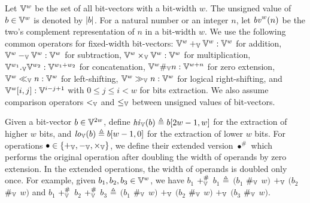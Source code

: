 Let $\mathbb{V}^w$ be the set of all bit-vectors with a bit-width $w$.
The unsigned value of $b \in \mathbb{V}^w$ is denoted by $|b|$.
For a natural number or an integer $n$, let $\mathit{bv}^w(n)$ be the two's complement representation of $n$ in a bit-width $w$.
We use the following common operators for fixed-width bit-vectors: $\mathbb{V}^w +_{\mathbb{V}} \mathbb{V}^w : \mathbb{V}^w$ for addition, $\mathbb{V}^w -_{\mathbb{V}} \mathbb{V}^w : \mathbb{V}^w$ for subtraction, $\mathbb{V}^w \times_{\mathbb{V}} \mathbb{V}^w : \mathbb{V}^w$ for multiplication, $\mathbb{V}^{w_1} ._{\mathbb{V}} \mathbb{V}^{w_2} : \mathbb{V}^{w_1 + w_2}$ for concatenation, $\mathbb{V}^w \#_{\mathbb{V}} n : \mathbb{V}^{w+n}$ for zero extension, $\mathbb{V}^w \ll_{\mathbb{V}} n : \mathbb{V}^w$ for left-shifting, $\mathbb{V}^w \gg_{\mathbb{V}} n : \mathbb{V}^w$ for logical right-shifting, and $\mathbb{V}^w[i,j] : \mathbb{V}^{i - j + 1}$ with $0 \leq j \leq i < w$ for bits extraction.
We also assume comparison operators $<_{\mathbb{V}}$ and $\leq_{\mathbb{V}}$ between unsigned values of bit-vectors.

Given a bit-vector $b \in \mathbb{V}^{2w}$, define $\mathit{hi}_{\mathbb{V}}(b) \triangleq b[2w - 1, w]$ for the extraction of higher $w$ bits, and $\mathit{lo}_{\mathbb{V}}(b) \triangleq b[w - 1, 0]$ for the extraction of lower $w$ bits.
For operations $\bullet \in \{+_{\mathbb{V}}, -_{\mathbb{V}}, \times_{\mathbb{V}}\}$, we define their extended version $\bullet^\#$ which performs the original operation after doubling the width of operands by zero extension.
In the extended operations, the width of operands is doubled only once.
For example, given $b_1, b_2, b_3 \in \mathbb{V}^{w}$, we have $b_1$ $+_{\mathbb{V}}^\#$ $b_1$ $\triangleq$ $(b_1$ $\#_{\mathbb{V}}$ $w)$ $+_{\mathbb{V}}$ $(b_2$ $\#_{\mathbb{V}}$ $w)$ and $b_1$ $+_{\mathbb{V}}^{\#}$ $b_2$ $+_{\mathbb{V}}^{\#}$ $b_3$ $\triangleq$ $(b_1$ $\#_{\mathbb{V}}$ $w)$ $+_{\mathbb{V}}$ $(b_2$ $\#_{\mathbb{V}}$ $w)$ $+_{\mathbb{V}}$ $(b_3$ $\#_{\mathbb{V}}$ $w)$.



